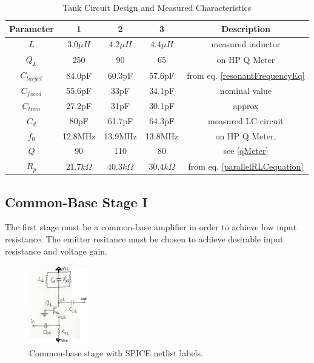 \documentclass[titlepage, letterpaper, 10.5pt]{article}
\begin{document}
\begin{table}[ht]
\centering
\caption{Tank Circuit Design and Measured Characteristics}
\begin{tabular}{c|c|c|c|c}
\hline\hline
Parameter	&1		&2		&3		&Description	\\
\hline\hline
$L$		&$3.0\mu H$	&$4.2\mu H$	&$4.4\mu H$	&measured inductor	\\
$Q_{L}$		&250		&90		&65		&on HP Q Meter	\\
\hline
$C_{target}$	&84.0pF		&60.3pF		&57.6pF		&from eq. \ref{resonantFrequencyEq}	\\
$C_{fixed}$	&55.6pF		&33pF		&34.1pF		&nominal value		\\
$C_{trim}$	&27.2pF		&31pF		&30.1pF		&approx		\\
\hline
$C_{d}$		&80pF		&61.7pF		&64.3pF		&measured LC circuit	\\
$f_{0}$		&12.8MHz	&13.9MHz	&13.8MHz	&on HP Q Meter,		\\
$Q$		&90		&110		&80	&see \ref{qMeter}	\\
$R_{p}$		&$21.7k\Omega$	&$40.3k\Omega$	&$30.4k\Omega$	&from eq. \ref{parallelRLCequation}	\\
\hline\hline
\end{tabular}
\label{tankCircuitCharacteristics}
\end{table}

\subsection{Common-Base Stage I}

The first stage must be a common-base amplifier in order to achieve
low input resistance. The emitter resitance must be
chosen to achieve desirable input resistance and voltage gain.

\begin{figure}[ht]
	\centering
	\includegraphics[width=0.23\textwidth]
		{figures/commonBaseStage}
	\caption{
		Common-base stage with SPICE netlist labels.
	}
	\label{commonBaseStage}
\end{figure}
\end{document}

